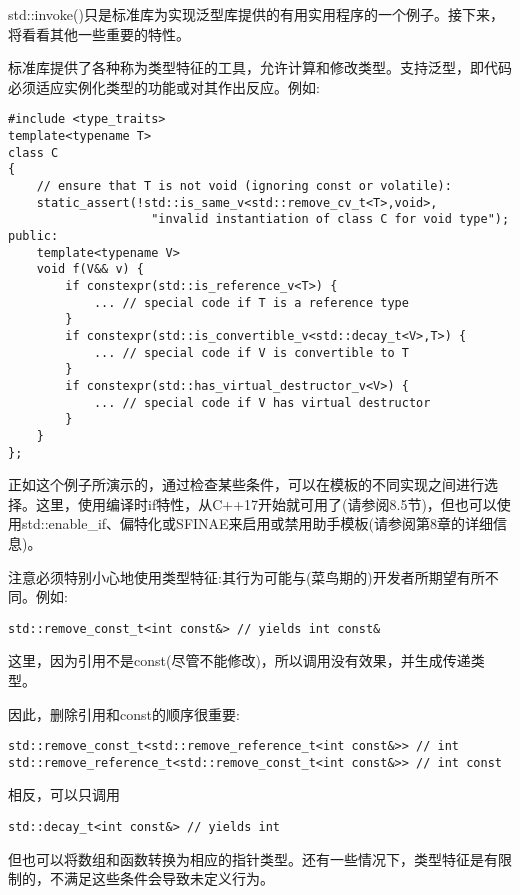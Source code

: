
std::invoke()只是标准库为实现泛型库提供的有用实用程序的一个例子。接下来，将看看其他一些重要的特性。


标准库提供了各种称为类型特征的工具，允许计算和修改类型。支持泛型，即代码必须适应实例化类型的功能或对其作出反应。例如:

\begin{lstlisting}[style=styleCXX]
#include <type_traits>
template<typename T>
class C
{
	// ensure that T is not void (ignoring const or volatile):
	static_assert(!std::is_same_v<std::remove_cv_t<T>,void>,
					"invalid instantiation of class C for void type");
public:
	template<typename V>
	void f(V&& v) {
		if constexpr(std::is_reference_v<T>) {
			... // special code if T is a reference type
		}
		if constexpr(std::is_convertible_v<std::decay_t<V>,T>) {
			... // special code if V is convertible to T
		}
		if constexpr(std::has_virtual_destructor_v<V>) {
			... // special code if V has virtual destructor
		}
	}
};
\end{lstlisting}

正如这个例子所演示的，通过检查某些条件，可以在模板的不同实现之间进行选择。这里，使用编译时if特性，从C++17开始就可用了(请参阅8.5节)，但也可以使用std::enable\_if、偏特化或SFINAE来启用或禁用助手模板(请参阅第8章的详细信息)。

注意必须特别小心地使用类型特征:其行为可能与(菜鸟期的)开发者所期望有所不同。例如:

\begin{lstlisting}[style=styleCXX]
std::remove_const_t<int const&> // yields int const&
\end{lstlisting}

这里，因为引用不是const(尽管不能修改)，所以调用没有效果，并生成传递类型。

因此，删除引用和const的顺序很重要:

\begin{lstlisting}[style=styleCXX]
std::remove_const_t<std::remove_reference_t<int const&>> // int
std::remove_reference_t<std::remove_const_t<int const&>> // int const
\end{lstlisting}

相反，可以只调用

\begin{lstlisting}[style=styleCXX]
std::decay_t<int const&> // yields int
\end{lstlisting}

但也可以将数组和函数转换为相应的指针类型。还有一些情况下，类型特征是有限制的，不满足这些条件会导致未定义行为。

